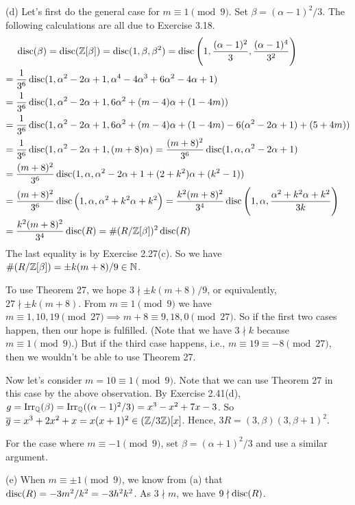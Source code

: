 \documentclass[../Marcus.tex]{subfiles}
\begin{document}
(d) Let's first do the general case for $m\equiv 1 \pmod{9}$. Set $\beta=(\alpha-1)^2/3$. The following calculations are all due to Exercise 3.18.
\begin{align*}
    &\operatorname{disc}(\beta) = \operatorname{disc}(\mathbb{Z}[\beta]) = \operatorname{disc}(1,\beta,\beta^2) = \operatorname{disc}\left(1,\frac{(\alpha-1)^2}{3},\frac{(\alpha-1)^4}{3^2}\right) \\ ={} &\frac{1}{3^6}\operatorname{disc}(1,\alpha^2-2\alpha+1,\alpha^4-4\alpha^3+6\alpha^2-4\alpha+1) \\ ={} &\frac{1}{3^6}\operatorname{disc}(1,\alpha^2-2\alpha+1,6\alpha^2+(m-4)\alpha+(1-4m)) \\ ={} &\frac{1}{3^6}\operatorname{disc}(1,\alpha^2-2\alpha+1,6\alpha^2+(m-4)\alpha+(1-4m)-6(\alpha^2-2\alpha+1)+(5+4m)) \\ ={} &\frac{1}{3^6}\operatorname{disc}(1,\alpha^2-2\alpha+1,(m+8)\alpha) = \frac{(m+8)^2}{3^6}\operatorname{disc}(1,\alpha,\alpha^2-2\alpha+1) \\ ={} &\frac{(m+8)^2}{3^6}\operatorname{disc}(1,\alpha,\alpha^2-2\alpha+1+(2+k^2)\alpha+(k^2-1)) \\ ={} &\frac{(m+8)^2}{3^6}\operatorname{disc}\left(1,\alpha,\alpha^2+k^2\alpha+k^2\right) = \frac{k^2(m+8)^2}{3^4}\operatorname{disc}\left(1,\alpha,\frac{\alpha^2+k^2\alpha+k^2}{3k}\right) \\ ={} &\frac{k^2(m+8)^2}{3^4}\operatorname{disc}(R) = \#(R/\mathbb{Z}[\beta])^2\operatorname{disc}(R)
\end{align*}
The last equality is by Exercise 2.27(c). So we have $\#(R/\mathbb{Z}[\beta])=\pm k(m+8)/9\in\mathbb{N}$.

To use Theorem 27, we hope $3\nmid \pm k(m+8)/9$, or equivalently, $27\nmid \pm k(m+8)$. From $m\equiv 1 \pmod{9}$ we have $m\equiv 1,10,19 \pmod{27} \implies m+8\equiv 9,18,0 \pmod{27}$. So if the first two cases happen, then our hope is fulfilled. (Note that we have $3\nmid k$ because $m\equiv 1 \pmod{9}$.) But if the third case happens, i.e., $m\equiv 19\equiv -8 \pmod{27}$, then we wouldn't be able to use Theorem 27.

Now let's consider $m=10\equiv 1\pmod{9}$. Note that we can use Theorem 27 in this case by the above observation. By Exercise 2.41(d), $g=\operatorname{Irr}_{\mathbb{Q}}(\beta)=\operatorname{Irr}_{\mathbb{Q}}((\alpha-1)^2/3)=x^3-x^2+7x-3$. So $\overline{g}=x^3+2x^2+x=x(x+1)^2\in(\mathbb{Z}/3\mathbb{Z})[x]$. Hence, $3R=(3,\beta)(3,\beta+1)^2$.

For the case where $m\equiv -1\pmod{9}$, set $\beta=(\alpha+1)^2/3$ and use a similar argument.

(e) When $m\equiv \pm1\pmod{9}$, we know from (a) that $\operatorname{disc}(R) = -3m^2/k^2 = -3h^2k^2$. As $3\nmid m$, we have $9 \nmid \operatorname{disc}(R)$.
\end{document}
